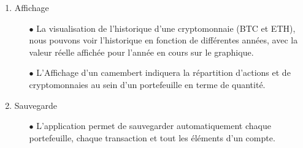 \documentclass[12pt]{article}
\begin{document}
\begin{enumerate}
\begin{enumerate}
    \end{enumerate}
    \item Affichage \begin{enumerate}
        \item [\tiny$\bullet$] La visualisation de l'historique d'une cryptomonnaie (BTC et ETH), nous pouvons voir l'historique en fonction de différentes années, avec la valeur réelle affichée pour l'année en cours sur le graphique.
        \item [\tiny$\bullet$] L'Affichage d'un camembert indiquera la répartition d'actions et de cryptomonnaies au sein d'un portefeuille en terme de quantité.
    \end{enumerate}
    \item Sauvegarde \begin{enumerate}
        \item [\tiny$\bullet$] L'application permet de sauvegarder automatiquement chaque portefeuille, chaque transaction et tout les éléments d'un compte.
    \end{enumerate}
\end{enumerate}



\newpage
\end{document}
